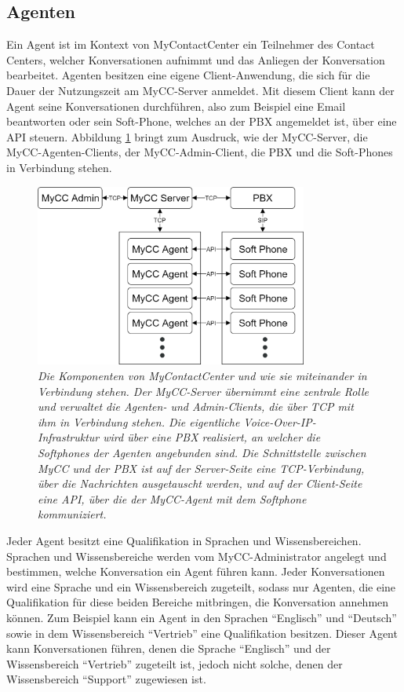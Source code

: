 \subsection{Agenten}
\label{subsec:Agenten}
Ein Agent ist im Kontext von MyContactCenter ein Teilnehmer des Contact Centers, welcher Konversationen aufnimmt und das Anliegen der Konversation bearbeitet. Agenten besitzen eine eigene Client-Anwendung, die sich für die Dauer der Nutzungszeit am MyCC-Server anmeldet.  Mit diesem Client kann der Agent seine Konversationen durchführen, also zum Beispiel eine Email beantworten oder sein Soft-Phone, welches an der PBX angemeldet ist, über eine API steuern. Abbildung \ref{fig:MyCCStructure}  bringt zum Ausdruck, wie der MyCC-Server, die MyCC-Agenten-Clients, der MyCC-Admin-Client, die PBX und die Soft-Phones in Verbindung stehen.
\begin{figure} %
	\centering
		\includegraphics[width=0.8\textwidth]{img/MyCCStructure.png}
	\caption[Komponententstruktur von MyContactCenter]{\textit{Die Komponenten von MyContactCenter und wie sie miteinander in Verbindung stehen. Der MyCC-Server übernimmt eine zentrale Rolle und verwaltet die Agenten- und Admin-Clients, die über TCP mit ihm in Verbindung stehen. Die eigentliche Voice-Over-IP-Infrastruktur wird über eine PBX realisiert, an welcher die Softphones der Agenten angebunden sind. Die Schnittstelle zwischen MyCC und der PBX ist auf der Server-Seite eine TCP-Verbindung, über die Nachrichten ausgetauscht werden, und auf der Client-Seite eine API, über die der MyCC-Agent mit dem Softphone kommuniziert.}}
	\label{fig:MyCCStructure}
\end{figure}
Jeder Agent besitzt eine Qualifikation in Sprachen und Wissensbereichen. Sprachen und Wissensbereiche werden vom MyCC-Administrator angelegt und bestimmen, welche Konversation ein Agent führen kann. Jeder Konversationen wird eine Sprache und ein Wissensbereich zugeteilt, sodass nur Agenten, die eine Qualifikation für diese beiden Bereiche mitbringen, die Konversation annehmen können. Zum Beispiel kann ein Agent in den Sprachen ``Englisch'' und ``Deutsch'' sowie in dem Wissensbereich ``Vertrieb'' eine Qualifikation besitzen. Dieser Agent kann Konversationen führen, denen die Sprache ``Englisch'' und der Wissensbereich ``Vertrieb'' zugeteilt ist, jedoch nicht solche, denen der Wissensbereich ``Support'' zugewiesen ist.


